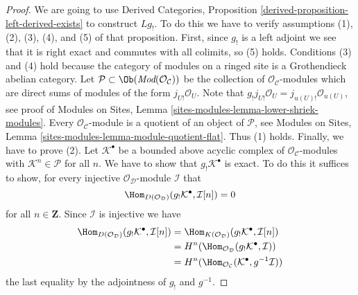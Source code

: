 \begin{proof}
We are going to use
Derived Categories, Proposition \ref{derived-proposition-left-derived-exists}
to construct $Lg_!$. To do this we have to verify assumptions
(1), (2), (3), (4), and (5) of that proposition.
First, since $g_!$ is a left adjoint
we see that it is right exact and commutes with all colimits, so
(5) holds. Conditions (3) and (4) hold because the category of modules
on a ringed site is a Grothendieck abelian category.
Let $\mathcal{P} \subset \Ob(\textit{Mod}(\mathcal{O}_\mathcal{C}))$
be the collection of $\mathcal{O}_\mathcal{C}$-modules which are direct
sums of modules of the form $j_{U!}\mathcal{O}_U$. Note that
$g_!j_{U!}\mathcal{O}_U = j_{u(U)!} \mathcal{O}_{u(U)}$, see proof of
Modules on Sites, Lemma \ref{sites-modules-lemma-lower-shriek-modules}.
Every $\mathcal{O}_\mathcal{C}$-module is a quotient of an object of
$\mathcal{P}$, see
Modules on Sites, Lemma \ref{sites-modules-lemma-module-quotient-flat}.
Thus (1) holds. Finally, we have to prove (2).
Let $\mathcal{K}^\bullet$ be a bounded above acyclic complex of
$\mathcal{O}_\mathcal{C}$-modules with $\mathcal{K}^n \in \mathcal{P}$
for all $n$. We have to show that $g_!\mathcal{K}^\bullet$ is
exact. To do this it suffices to show, for every injective
$\mathcal{O}_\mathcal{D}$-module $\mathcal{I}$ that
$$
\Hom_{D(\mathcal{O}_\mathcal{D})}(
g_!\mathcal{K}^\bullet, \mathcal{I}[n]) = 0
$$
for all $n \in \mathbf{Z}$. Since $\mathcal{I}$ is injective we have
\begin{align*}
\Hom_{D(\mathcal{O}_\mathcal{D})}(
g_!\mathcal{K}^\bullet, \mathcal{I}[n])
& =
\Hom_{K(\mathcal{O}_\mathcal{D})}(
g_!\mathcal{K}^\bullet, \mathcal{I}[n]) \\
& =
H^n(\Hom_{\mathcal{O}_\mathcal{D}}(
g_!\mathcal{K}^\bullet, \mathcal{I})) \\
& =
H^n(\Hom_{\mathcal{O}_\mathcal{C}}(
\mathcal{K}^\bullet, g^{-1}\mathcal{I}))
\end{align*}
the last equality by the adjointness of $g_!$ and $g^{-1}$.


\end{proof}
